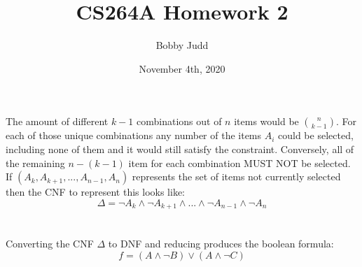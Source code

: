 \documentclass{article}
\title{CS264A Homework 2}
\author{Bobby Judd}
\date{November 4th, 2020}
\begin{document}
\maketitle

\clearpage
\section{}
The amount of different $k-1$ combinations out of $n$ items would be ${n \choose k-1}$.  For each of those unique combinations any number of the items $A_i$ could be selected, including none of them and it would still satisfy the constraint.  Conversely, all of the remaining $n-(k-1)$ item for each combination MUST NOT be selected. If $(A_k, A_{k+1}, ... , A_{n-1}, A_{n})$ represents the set of items not currently selected then the CNF to represent this looks like:
\[
\Delta = \lnot A_k \land \lnot A_{k+1} \land ... \land \lnot A_{n-1}\land \lnot A_{n}
\]

\clearpage
\section{}
Converting the CNF $\Delta$ to DNF and reducing produces the boolean formula:
\[f = (A \land \lnot B) \lor (A \land \lnot C) \]
\end{document}
